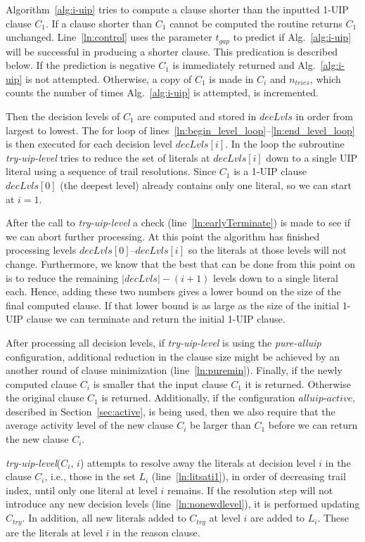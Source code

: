 \documentclass[runningheads]{llncs}
\newcommand{\oneuip}{1-UIP\xspace}
\newcommand{\tgap}{t_{\mathit{gap}}}
\newcommand{\ntries}{n_{\mathit{tries}}}
\newcommand{\tryuiplevel}{\textit{try-uip-level}\xspace}
\newcommand{\allUipPure}{\textit{pure-alluip}\xspace}
\newcommand{\allUipAct}{\textit{alluip-active}}
\newcommand{\dlevels}{\ensuremath{\mathit{decLvls}}}
\newcommand{\ctry}{C_{\mathit{try}}}
\begin{document}
Algorithm~\ref{alg:i-uip} tries to compute a clause shorter than the
inputted \oneuip clause $C_1$. If a clause shorter than $C_1$ cannot
be computed the routine returns $C_1$ unchanged. Line~\ref{ln:control}
uses the parameter $\tgap$ to predict if Alg.~\ref{alg:i-uip} will be
successful in producing a shorter clause. This predication is
described below. If the prediction is negative $C_1$ is immediately
returned and Alg.~\ref{alg:i-uip} is not attempted. Otherwise, a copy
of $C_1$ is made in $C_i$ and $\ntries$, which counts the number of
times Alg.~\ref{alg:i-uip} is attempted, is incremented.

Then the decision levels of $C_1$ are computed and stored in
$\dlevels$ in order from largest to lowest. The for loop of
lines~\ref{ln:begin_level_loop}--\ref{ln:end_level_loop} is then
executed for each decision level $\dlevels[i]$. In the loop the
subroutine \tryuiplevel tries to reduce the set of literals at
$\dlevels[i]$ down to a single UIP literal using a sequence of trail
resolutions. Since $C_1$ is a \oneuip clause $\dlevels[0]$ (the
deepest level) already contains only one literal, so we can start at
$i=1$.

After the call to \tryuiplevel a check (line~\ref{ln:earlyTerminate})
is made to see if we can abort further processing. At this point the
algorithm has finished processing levels $\dlevels[0]$--$\dlevels[i]$
so the literals at those levels will not change. Furthermore, we know that
the best that can be done from this point on is to reduce the
remaining $|\dlevels| - (i+1)$ levels down to a single literal
each. Hence, adding these two numbers gives a lower bound on the size
of the final computed clause. If that lower bound is as large as the
size of the initial \oneuip clause we can terminate and return the initial
\oneuip clause.

After processing all decision levels, if \tryuiplevel is using the
\allUipPure configuration, additional reduction in the clause size
might be achieved by an another round of clause minimization
(line~\ref{ln:puremin}). Finally, if the newly computed clause $C_i$
is smaller that the input clause $C_1$ it is returned. Otherwise the
original clause $C_1$ is returned. Additionally, if the configuration
$\allUipAct$, described in Section~\ref{sec:active}, is being used,
then we also require that the average activity level of the new clause
$C_i$ be larger than $C_1$ before we can return the new clause $C_i$.

\tryuiplevel($C_i$, $i$) attempts to resolve away the literals at
decision level $i$ in the clause $C_i$, i.e., those in the set $L_i$
(line~\ref{ln:litsati1}), in order of decreasing trail index, until
only one literal at level $i$ remains. If the resolution step will not
introduce any new decision levels (line~\ref{ln:nonewdlevel}), it is
performed updating $\ctry$. In addition, all new literals added to
$\ctry$ at level $i$ are added to $L_i$. These are the literals at
level $i$ in the reason clause.
\end{document}
